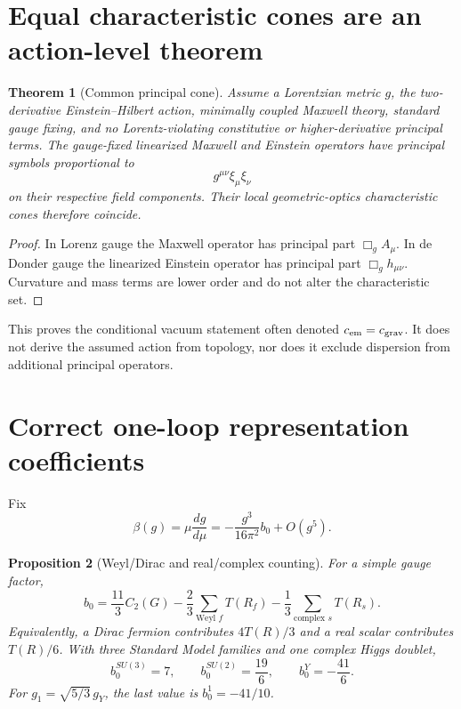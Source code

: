 \documentclass[11pt]{article}
\theoremstyle{plain}
\newtheorem{theorem}{Theorem}[section]
\newtheorem{proposition}[theorem]{Proposition}
\theoremstyle{definition}
\theoremstyle{remark}
\begin{document}
\section{Equal characteristic cones are an action-level theorem}

\begin{theorem}[Common principal cone]
\label{thm:principal-cone}
Assume a Lorentzian metric $g$, the two-derivative Einstein--Hilbert action,
minimally coupled Maxwell theory, standard gauge fixing, and no
Lorentz-violating constitutive or higher-derivative principal terms. The
gauge-fixed linearized Maxwell and Einstein operators have principal symbols
proportional to
\[
 g^{\mu\nu}\xi_\mu\xi_\nu
\]
on their respective field components. Their local geometric-optics
characteristic cones therefore coincide.
\end{theorem}

\begin{proof}
In Lorenz gauge the Maxwell operator has principal part $\Box_g A_\mu$. In de
Donder gauge the linearized Einstein operator has principal part
$\Box_g h_{\mu\nu}$. Curvature and mass terms are lower order and do not alter
the characteristic set.
\end{proof}

This proves the conditional vacuum statement often denoted
$c_{\rm em}=c_{\rm grav}$. It does not derive the assumed action from topology,
nor does it exclude dispersion from additional principal operators.

\section{Correct one-loop representation coefficients}

Fix
\[
 \beta(g)=\mu\frac{dg}{d\mu}
 =-\frac{g^3}{16\pi^2}b_0+O(g^5).
\]

\begin{proposition}[Weyl/Dirac and real/complex counting]
\label{prop:beta}
For a simple gauge factor,
\begin{equation}
 b_0=\frac{11}{3}C_2(G)
 -\frac{2}{3}\sum_{\text{Weyl }f}T(R_f)
 -\frac{1}{3}\sum_{\text{complex }s}T(R_s).
 \label{eq:beta-correct}
\end{equation}
Equivalently, a Dirac fermion contributes $4T(R)/3$ and a real scalar
contributes $T(R)/6$. With three Standard Model families and one complex Higgs
doublet,
\[
 b_0^{SU(3)}=7,\qquad
 b_0^{SU(2)}=\frac{19}{6},\qquad
 b_0^{Y}=-\frac{41}{6}.
\]
For $g_1=\sqrt{5/3}\,g_Y$, the last value is $b_0^{1}=-41/10$.
\end{proposition}
\end{document}
